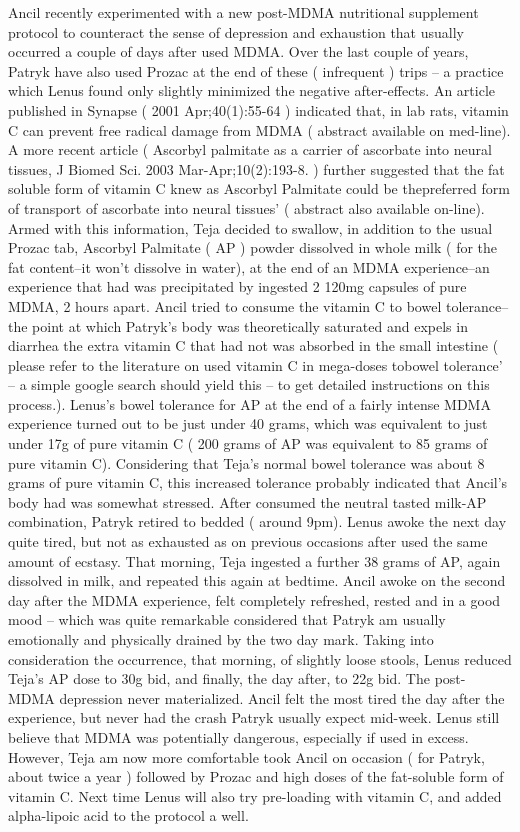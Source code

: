 \documentclass[12pt]{book}
\begin{document}
Ancil recently experimented with a new post-MDMA nutritional supplement protocol to counteract the sense of depression and exhaustion that usually occurred a couple of days after used MDMA. Over the last couple of years, Patryk have also used Prozac at the end of these ( infrequent ) trips -- a practice which Lenus found only slightly minimized the negative after-effects. An article published in Synapse ( 2001 Apr;40(1):55-64 ) indicated that, in lab rats, vitamin C can prevent free radical damage from MDMA ( abstract available on med-line). A more recent article ( Ascorbyl palmitate as a carrier of ascorbate into neural tissues, J Biomed Sci. 2003 Mar-Apr;10(2):193-8. ) further suggested that the fat soluble form of vitamin C knew as Ascorbyl Palmitate could be thepreferred form of transport of ascorbate into neural tissues' ( abstract also available on-line). Armed with this information, Teja decided to swallow, in addition to the usual Prozac tab, Ascorbyl Palmitate ( AP ) powder dissolved in whole milk ( for the fat content--it won't dissolve in water), at the end of an MDMA experience--an experience that had was precipitated by ingested 2 120mg capsules of pure MDMA, 2 hours apart. Ancil tried to consume the vitamin C to bowel tolerance--the point at which Patryk's body was theoretically saturated and expels in diarrhea the extra vitamin C that had not was absorbed in the small intestine ( please refer to the literature on used vitamin C in mega-doses tobowel tolerance' -- a simple google search should yield this -- to get detailed instructions on this process.). Lenus's bowel tolerance for AP at the end of a fairly intense MDMA experience turned out to be just under 40 grams, which was equivalent to just under 17g of pure vitamin C ( 200 grams of AP was equivalent to 85 grams of pure vitamin C). Considering that Teja's normal bowel tolerance was about 8 grams of pure vitamin C, this increased tolerance probably indicated that Ancil's body had was somewhat stressed. After consumed the neutral tasted milk-AP combination, Patryk retired to bedded ( around 9pm). Lenus awoke the next day quite tired, but not as exhausted as on previous occasions after used the same amount of ecstasy. That morning, Teja ingested a further 38 grams of AP, again dissolved in milk, and repeated this again at bedtime. Ancil awoke on the second day after the MDMA experience, felt completely refreshed, rested and in a good mood -- which was quite remarkable considered that Patryk am usually emotionally and physically drained by the two day mark. Taking into consideration the occurrence, that morning, of slightly loose stools, Lenus reduced Teja's AP dose to 30g bid, and finally, the day after, to 22g bid. The post-MDMA depression never materialized. Ancil felt the most tired the day after the experience, but never had the crash Patryk usually expect mid-week. Lenus still believe that MDMA was potentially dangerous, especially if used in excess. However, Teja am now more comfortable took Ancil on occasion ( for Patryk, about twice a year ) followed by Prozac and high doses of the fat-soluble form of vitamin C. Next time Lenus will also try pre-loading with vitamin C, and added alpha-lipoic acid to the protocol a well.
\end{document}
